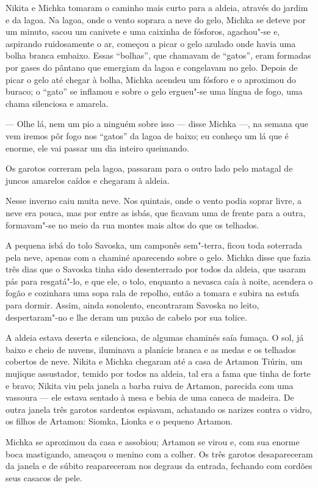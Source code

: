 Nikita e Michka tomaram o caminho mais curto para a aldeia, através do
jardim e da lagoa. Na lagoa, onde o vento soprara a neve do gelo, Michka
se deteve por um minuto, sacou um canivete e uma caixinha de fósforos,
agachou"-se e, aspirando ruidosamente o ar, começou a picar o gelo
azulado onde havia uma bolha branca embaixo. Essas ``bolhas'',
que chamavam de ``gatos'', eram formadas por gases do pântano que emergiam
da lagoa e congelavam no gelo. Depois de picar o gelo até chegar à
bolha, Michka acendeu um fósforo e o aproximou do buraco; o ``gato'' se
inflamou e sobre o gelo ergueu"-se uma língua de fogo, uma chama
silenciosa e amarela.

--- Olhe lá, nem um pio a ninguém sobre isso --- disse Michka ---, na
semana que vem iremos pôr fogo nos ``gatos'' da lagoa de baixo; eu
conheço um lá que é enorme, ele vai passar um dia inteiro queimando.

Os garotos correram pela lagoa, passaram para o outro lado pelo matagal
de juncos amarelos caídos e chegaram à aldeia.

Nesse inverno caiu muita neve. Nos quintais, onde o vento podia soprar
livre, a neve era pouca, mas por entre as isbás, que ficavam uma de
frente para a outra, formavam"-se no meio da rua montes mais altos do que
os telhados.

A pequena isbá do tolo Savoska, um camponês sem"-terra, ficou toda
soterrada pela neve, apenas com a chaminé aparecendo sobre o gelo.
Michka disse que fazia três dias que o Savoska tinha sido desenterrado
por todos da aldeia, que usaram pás para resgatá"-lo, e que ele, o tolo,
enquanto a nevasca caía à noite, acendera o fogão e cozinhara uma sopa
rala de repolho, então a tomara e subira na estufa para dormir. Assim,
ainda sonolento, encontraram Savoska no leito, despertaram"-no e lhe
deram um puxão de cabelo por sua tolice.

A aldeia estava deserta e silenciosa, de algumas chaminés saía fumaça. O
sol, já baixo e cheio de nuvens, iluminava a planície branca e as
medas e os telhados cobertos de neve. Nikita e Michka chegaram até a
casa de Artamon Tiúrin, um mujique assustador, temido por todos na
aldeia, tal era a fama que tinha de forte e bravo; Nikita viu pela
janela a barba ruiva de Artamon, parecida com uma vassoura --- ele
estava sentado à mesa e bebia de uma caneca de madeira. De outra janela
três garotos sardentos espiavam, achatando os narizes contra o vidro, os
filhos de Artamon: Siomka, Lionka e o pequeno Artamon.

Michka se aproximou da casa e assobiou; Artamon se virou e, com sua
enorme boca mastigando, ameaçou o menino com a colher. Os três garotos
desapareceram da janela e de súbito reapareceram nos degraus da entrada,
fechando com cordões seus casacos de pele.


